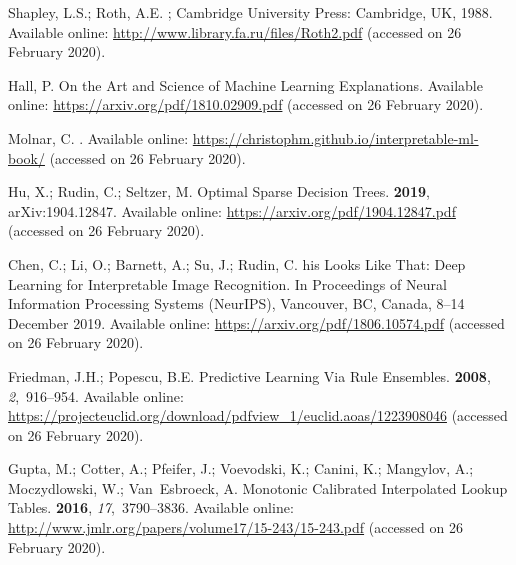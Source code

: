 \documentclass[information,article,accept,moreauthors,pdftex]{Definitions/mdpi}
\begin{document}
{\begin{thebibliography}{999}
Shapley, L.S.; Roth, A.E.
; Cambridge University Press: Cambridge, UK, 1988. 
\newblock Available online: \url{http://www.library.fa.ru/files/Roth2.pdf} (accessed on 26 February 2020).

Hall, P.
\newblock On the {A}rt and {S}cience of {M}achine {L}earning {E}xplanations.
\newblock Available online: \url{https://arxiv.org/pdf/1810.02909.pdf} (accessed on 26 February 2020).

Molnar, C.
.
\newblock Available online: \url{https://christophm.github.io/interpretable-ml-book/} (accessed on 26 February 2020).

Hu, X.; Rudin, C.; Seltzer, M.
\newblock Optimal {S}parse {D}ecision {T}rees.
 {\bf 2019}, arXiv:1904.12847.
\newblock Available online: \url{https://arxiv.org/pdf/1904.12847.pdf} (accessed on 26 February 2020).

Chen, C.; Li, O.; Barnett, A.; Su, J.; Rudin, C.
his {L}ooks {L}ike {T}hat: {D}eep {L}earning for {I}nterpretable
  {I}mage {R}ecognition.
\newblock  In Proceedings of Neural Information Processing Systems {(NeurIPS)}, Vancouver, BC, Canada, 8--14 December 2019. 
\newblock Available online: \url{https://arxiv.org/pdf/1806.10574.pdf} (accessed on 26 February 2020).

Friedman, J.H.; Popescu, B.E.
\newblock Predictive {L}earning {V}ia {R}ule {E}nsembles.
 {\bf 2008}, {\em 2},~916--954.
\newblock Available online: 
  \url{https://projecteuclid.org/download/pdfview_1/euclid.aoas/1223908046} (accessed on 26 February 2020).

Gupta, M.; Cotter, A.; Pfeifer, J.; Voevodski, K.; Canini, K.; Mangylov, A.;
  Moczydlowski, W.; Van~Esbroeck, A.
\newblock Monotonic {C}alibrated {I}nterpolated {L}ookup {T}ables.
 {\bf 2016}, {\em
  17},~3790--3836.
\newblock Available online: \url{http://www.jmlr.org/papers/volume17/15-243/15-243.pdf} (accessed on 26 February 2020).


\end{thebibliography}}
\end{document}
